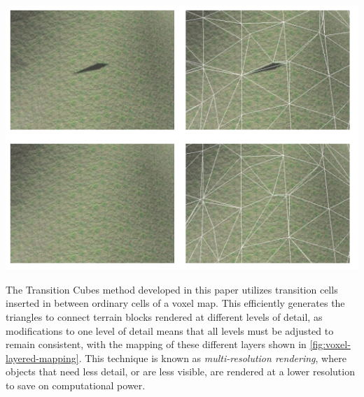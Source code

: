 \documentclass[10pt]{report}
\begin{document}
		\begin{minipage}{\textwidth}
			\centering
			\includegraphics[scale=.75]{voxel-seam}
			\label{fig:voxel-artifact}
		\end{minipage}
		
		The Transition Cubes method developed in this paper utilizes transition cells inserted in between ordinary cells of a voxel map. This efficiently generates the triangles to connect terrain blocks rendered at different levels of detail, as modifications to one level of detail means that all levels must be adjusted to remain consistent, with the mapping of these different layers shown in \autoref{fig:voxel-layered-mapping}. This technique is known as \emph{multi-resolution rendering}, where objects that need less detail, or are less visible, are rendered at a lower resolution to save on computational power. 
		
\end{document}
